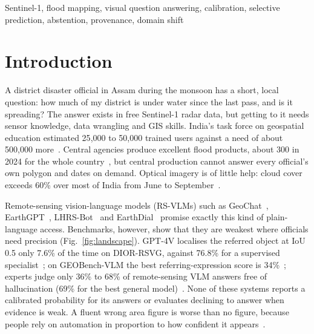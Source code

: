 \documentclass[conference]{IEEEtran}
\begin{document}
\begin{IEEEkeywords}
Sentinel-1, flood mapping, visual question answering, calibration, selective prediction, abstention, provenance, domain shift
\end{IEEEkeywords}

\section{Introduction}

A district disaster official in Assam during the monsoon has a short, local question: how much of my district is under water since the last pass, and is it spreading? The answer exists in free Sentinel-1 radar data, but getting to it needs sensor knowledge, data wrangling and GIS skills. India's task force on geospatial education estimated 25{,}000 to 50{,}000 trained users against a need of about 500{,}000 more~\cite{ntfge2013}. Central agencies produce excellent flood products, about 300 in 2024 for the whole country~\cite{india2025copuos,nrsc2023atlas}, but central production cannot answer every official's own polygon and dates on demand. Optical imagery is of little help: cloud cover exceeds 60\% over most of India from June to September~\cite{shang2018monsoon}.

Remote-sensing vision-language models (RS-VLMs) such as GeoChat~\cite{kuckreja2024geochat}, EarthGPT~\cite{zhang2024earthgpt}, LHRS-Bot~\cite{muhtar2024lhrsbot} and EarthDial~\cite{soni2025earthdial} promise exactly this kind of plain-language access. Benchmarks, however, show that they are weakest where officials need precision (Fig.~\ref{fig:landscape}). GPT-4V localises the referred object at IoU 0.5 only 7.6\% of the time on DIOR-RSVG, against 76.8\% for a supervised specialist~\cite{zhang2024vleo}; on GEOBench-VLM the best referring-expression score is 34\%~\cite{danish2025geobench}; experts judge only 36\% to 68\% of remote-sensing VLM answers free of hallucination (69\% for the best general model)~\cite{zhou2026rshallu}. None of these systems reports a calibrated probability for its answers or evaluates declining to answer when evidence is weak. A fluent wrong area figure is worse than no figure, because people rely on automation in proportion to how confident it appears~\cite{lee2004trust}.
\end{document}
